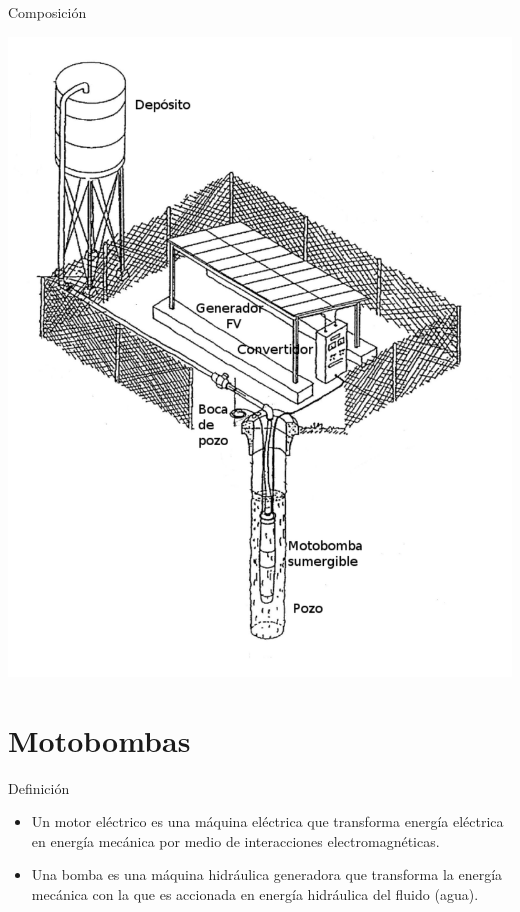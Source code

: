 \documentclass[xcolor={usenames,svgnames,dvipsnames}]{beamer}
\begin{document}
\begin{frame}[label={sec:org75e20f5}]{Composición}
\begin{center}
\includegraphics[height=\textheight]{../figs/EsquemaBombeo_oscar.pdf}
\end{center}
\end{frame}

\section{Motobombas}
\label{sec:org7341896}

\begin{frame}[label={sec:org6d5f8a1}]{Definición}
\begin{itemize}
\item Un \alert{motor eléctrico} es una máquina eléctrica que \alert{transforma energía eléctrica en energía mecánica} por medio de interacciones electromagnéticas.

\item Una \alert{bomba} es una \alert{máquina hidráulica} generadora que \alert{transforma la energía mecánica} con la que es accionada \alert{en energía hidráulica del fluido} (agua).
\end{itemize}
\end{frame}
\end{document}

